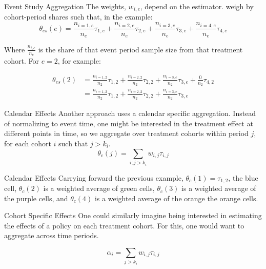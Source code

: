 \documentclass[11pt]{beamer}
\begin{document}
\begin{frame}{Event Study Aggregation}
    The weights, $w_{i,e}$, depend on the estimator. \textcite{sun2021estimating} weigh by cohort-period shares such that, in the example:
    \begin{equation}
        \theta_{es}(e) = \frac{n_{i=1, e}}{n_{e}} \tau_{1,e} + \frac{n_{i=2, e}}{n_{e}} \tau_{2,e}+\frac{n_{i=3, e}}{n_{e}} \tau_{3,e}+\frac{n_{i=4, e}}{n_{e}} \tau_{4,e}
    \end{equation}

    Where $\frac{n_{i,e}}{n_e}$ is the share of that event period sample size from that treatment cohort. For $e = 2$, for example:

    \begin{align*}
                \theta_{es}(2) &= \frac{n_{i=1, 2}}{n_{2}} \tau_{1,2} + \frac{n_{i=2, 2}}{n_{2}} \tau_{2,2}+\frac{n_{i=3, e}}{n_{2}} \tau_{3,e}+\frac{0}{n_{2}} \tau_{4,2} \\
                & = \frac{n_{i=1, 2}}{n_{2}} \tau_{1,2} + \frac{n_{i=2, 2}}{n_{2}} \tau_{2,2}+\frac{n_{i=3, e}}{n_{2}} \tau_{3,e}
    \end{align*}
\end{frame}

\begin{frame}{Calendar Effects}
    Another approach uses a calendar specific aggregation. Instead of normalizing to event time, one might be interested in the treatment effect at different points in time, so we aggregate over treatment cohorts within period $j$, for each cohort $i$ such that $j > k_i$.
    \begin{equation}
        \theta_c(j) = \sum_{i;j > k_i} w_{i,j} \tau_{i,j}
    \end{equation}
\end{frame}

\begin{frame}{Calendar Effects}
    Carrying forward the previous example,  $\theta_{c}(1) = \tau_{1,2}$, the blue cell, $\theta_{c}(2)$ is a weighted average of green cells, $\theta_{c}(3)$ is a weighted average of the purple cells, and $\theta_{c}(4)$ is a weighted average of the orange the orange cells.

    
\end{frame}

\begin{frame}{Cohort Specific Effects}
    One could similarly imagine being interested in estimating the effects of a policy on each treatment cohort. For this, one would want to aggregate across time periods. 

    \begin{equation}
        \alpha_i = \sum_{j > k_i} w_{i,j} \tau_{i,j}
    \end{equation}
\end{frame}
\end{document}
